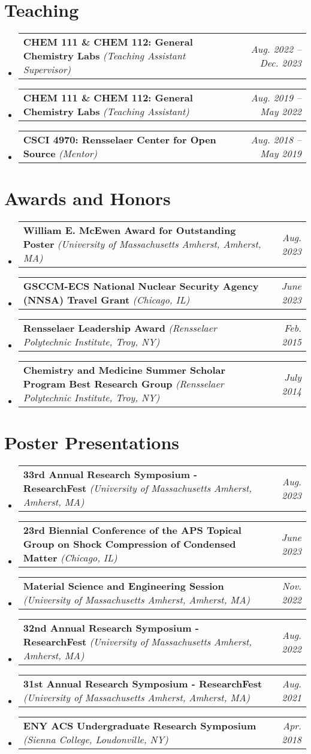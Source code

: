 \documentclass[letterpaper,11pt]{article}
\makeatletter
\newcommand{\award}[3]{
    \vspace{-2pt}
    \scriptsize
    \item[]
    \begin{tabularx}{\textwidth}{l@{\extracolsep{\fill}}r}
        \textbf{#1} \textit{(#2)} & \textit{#3} \\
    \end{tabularx}\vspace{-12pt}
}
\newcommand{\presentation}[3]{
    \vspace{-2pt}
    \scriptsize
    \item[]
    \begin{tabularx}{\textwidth}{l@{\extracolsep{\fill}}r}
        \textbf{#1} \textit{(#2)} & \textit{#3} \\
    \end{tabularx}\vspace{-12pt}
}
\newcommand{\teaching}[3]{
    \vspace{-2pt}
    \scriptsize
    \item[]
    \begin{tabularx}{\textwidth}{l@{\extracolsep{\fill}}r}
        \textbf{#1} \textit{(#2)} & \textit{#3} \\
    \end{tabularx}\vspace{-12pt}
}
\makeatother
\begin{document}
\section{Teaching}
    \vspace{4pt}
    \begin{itemize}[leftmargin=0pt]
        \teaching{CHEM 111 \& CHEM 112: General Chemistry Labs}{Teaching Assistant Supervisor}{Aug. 2022 -- Dec. 2023}
        \teaching{CHEM 111 \& CHEM 112: General Chemistry Labs}{Teaching Assistant}{Aug. 2019 -- May 2022}
        \teaching{CSCI 4970: Rensselaer Center for Open Source}{Mentor}{Aug. 2018 -- May 2019}
    \end{itemize}

\vspace{2pt}
\section{Awards and Honors}
    \vspace{4pt}
    \begin{itemize}[leftmargin=0pt]
        \award{William E. McEwen Award for Outstanding Poster}{University of Massachusetts Amherst, Amherst, MA}{Aug. 2023}
        \award{GSCCM-ECS National Nuclear Security Agency (NNSA) Travel Grant}{Chicago, IL}{June 2023}
        \award{Rensselaer Leadership Award}{Rensselaer Polytechnic Institute, Troy, NY}{Feb. 2015}
        \award{Chemistry and Medicine Summer Scholar Program Best Research Group}{Rensselaer Polytechnic Institute, Troy, NY}{July 2014}
    \end{itemize}

\vspace{2pt}
\section{Poster Presentations}
    \vspace{4pt}
    \begin{itemize}[leftmargin=0pt]
        \presentation{33rd Annual Research Symposium - ResearchFest}{University of Massachusetts Amherst, Amherst, MA}{Aug. 2023}
        \presentation{23rd Biennial Conference of the APS Topical Group on Shock Compression of Condensed Matter}{Chicago, IL}{June 2023}
        \presentation{Material Science and Engineering Session}{University of Massachusetts Amherst, Amherst, MA}{Nov. 2022}
        \presentation{32nd Annual Research Symposium - ResearchFest}{University of Massachusetts Amherst, Amherst, MA}{Aug. 2022}
        \presentation{31st Annual Research Symposium - ResearchFest}{University of Massachusetts Amherst, Amherst, MA}{Aug. 2021}
        \presentation{ENY ACS Undergraduate Research Symposium}{Sienna College, Loudonville, NY}{Apr. 2018}
    \end{itemize}
    
\end{document}
